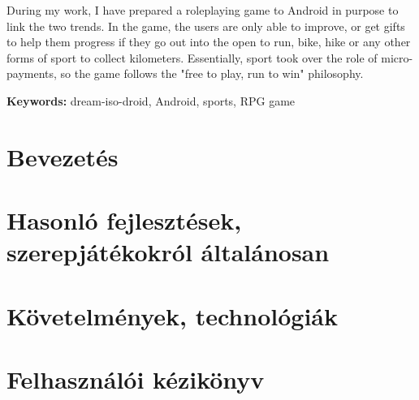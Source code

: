 \documentclass[a4paper,oneside,10pt]{report}
\begin{document}
During my work, I have prepared a roleplaying game to Android in purpose to link the two trends.
In the game, the users are only able to improve, or get gifts to help them progress if they go out into the open to run, bike, hike or any other forms of sport to collect kilometers.
Essentially, sport took over the role of micro-payments, so the game follows the "free to play, run to win" philosophy.

\textbf{Keywords:} dream-iso-droid, Android, sports, RPG game
\tableofcontents
\newpage
\listoffigures
\newpage






\pagestyle{plain} %

\chapter{Bevezetés}
\label{bev}


\chapter{Hasonló fejlesztések, szerepjátékokról általánosan}
\label{bem}


\chapter{Követelmények, technológiák}
\label{kovetelmeny}


\chapter{Felhasználói kézikönyv}
\label{usermanual}

\end{document}

